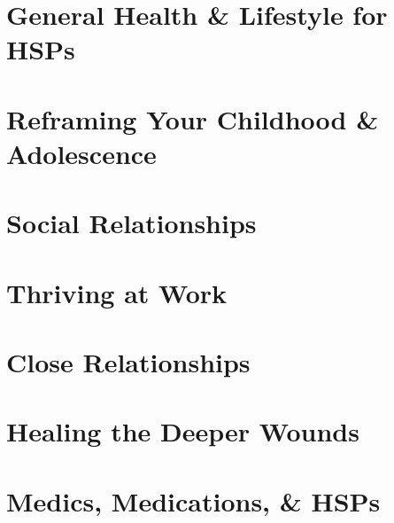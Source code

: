 \documentclass{article}
\numberwithin{equation}{section}
\begin{document}

\section{General Health \& Lifestyle for HSPs}


\section{Reframing Your Childhood \& Adolescence}


\section{Social Relationships}


\section{Thriving at Work}


\section{Close Relationships}


\section{Healing the Deeper Wounds}


\section{Medics, Medications, \& HSPs}

\end{document}
